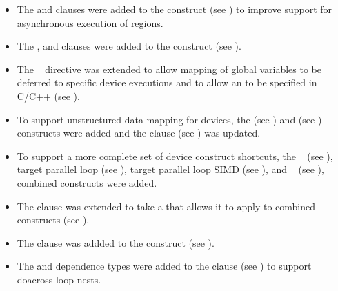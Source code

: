 \begin{itemize}
\item The  and  clauses were added to the 
       construct (see ) 
      to improve support for asynchronous execution of  regions. 

\item The ,  and  clauses 
      were added to the  construct (see ).

\item The ~ directive was extended to allow 
      mapping of global variables to be deferred to specific device 
      executions and to allow an 
      to be specified in C/C++ (see ).

\item To support unstructured data mapping for devices, the 
       (see ) and  (see ) constructs were added and the  clause 
      (see ) was updated.

\item To support a more complete set of device construct shortcuts, the
      ~ 
      (see ), 
      target parallel loop 
      (see ),
      target parallel loop SIMD 
      (see ),
      and ~ 
      (see ),
      combined constructs were added.

\item The  clause was extended to take a
       that allows it to apply
      to combined constructs (see ).

\item The  clause was addded to the  construct
      (see ).

\item The  and  dependence types were added to the 
       clause (see ) to support 
      doacross loop nests. 


\end{itemize}
